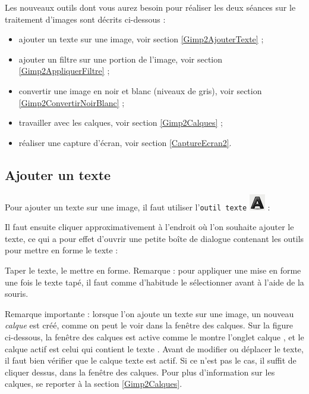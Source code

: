 Les nouveaux outils dont vous aurez besoin pour réaliser les deux séances sur le traitement d'images sont décrits ci-dessous :

\begin{itemize}   
\item ajouter un texte sur une image, voir section \vref{Gimp2AjouterTexte} ;
\item ajouter un filtre sur une portion de l'image, voir section \vref{Gimp2AppliquerFiltre} ;
\item convertir une image en noir et blanc (niveaux de gris), voir section \vref{Gimp2ConvertirNoirBlanc} ;
\item travailler avec les calques, voir section \vref{Gimp2Calques} ;   
\item réaliser une capture d'écran, voir section \vref{CaptureEcran2}.
\end{itemize}  



\subsection{Ajouter un texte}\label{Gimp2AjouterTexte}

Pour ajouter un texte sur une image, il faut utiliser l'\texttt{outil texte} \includegraphics[width=.6cm]{./images/image02/iconeTexte} :


Il faut ensuite cliquer approximativement à l'endroit où l'on souhaite ajouter le texte, ce qui a pour effet d'ouvrir une petite boîte de dialogue contenant les outils pour mettre en forme le texte :


Taper le texte, le mettre en forme. Remarque : pour appliquer une mise en forme une fois le texte tapé, il faut comme d'habitude le sélectionner avant à l'aide de la souris.


Remarque importante\label{remarqueCalque} : lorsque l'on ajoute un texte sur une image, un nouveau \emph{calque} est créé, comme on peut le voir dans la fenêtre des calques. Sur la figure ci-dessous, la fenêtre des calques est active comme le montre l'onglet calque , et le calque actif est celui qui contient le texte . Avant de modifier ou déplacer le texte, il faut bien vérifier que le calque texte est actif. Si ce n'est pas le cas, il suffit de cliquer dessus, dans la fenêtre des calques. Pour plus d'information sur les calques, se reporter à la section \vref{Gimp2Calques}. 

